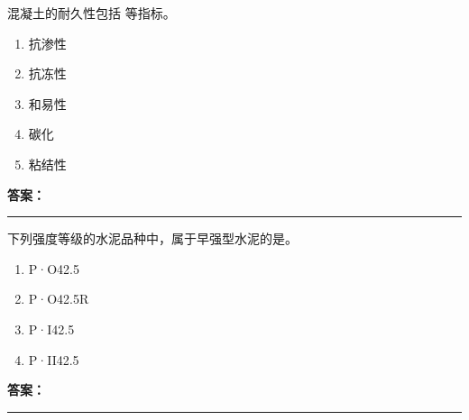 \documentclass[UTF8,fontset=fandol,11pt]{ctexart}
\newcommand{\answerline}{\textcolor{answerred}{\rule{2.4cm}{0.7pt}}}
\begin{document}
\begin{quizbox}[title={乱序第 64 题｜第四章混凝土结构工程}]

混凝土的耐久性包括 等指标。\\

\begin{enumerate}[label=\Alph*.]

\item 抗渗性

\item 抗冻性

\item 和易性

\item 碳化

\item 粘结性

\end{enumerate}

\textbf{\textcolor{answerred}{答案：}} \answerline

\end{quizbox}

\vspace{0.2em}

\begin{quizbox}[title={乱序第 65 题｜第四章混凝土结构工程}]

下列强度等级的水泥品种中，属于早强型水泥的是。\\

\begin{enumerate}[label=\Alph*.]

\item P·O42.5

\item P·O42.5R

\item P·I42.5

\item P·II42.5

\end{enumerate}

\textbf{\textcolor{answerred}{答案：}} \answerline

\end{quizbox}

\vspace{0.2em}
\end{document}
